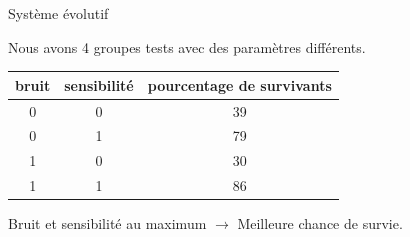 \documentclass[aspectratio=43, a4paper, 12pt]{beamer}
\begin{document}
\begin{frame}{Système évolutif}	

\begin{center}Nous avons 4 groupes tests avec des paramètres différents.\end{center}

\begin{center}\begin{tabular}{|c|c|c|} \hline	
          \centering	
			bruit & sensibilité & pourcentage de survivants \\ \hline
			0 & 0 & 39 \\ \hline
			0 & 1 & 79 \\ \hline
			1 & 0 & 30 \\ \hline
			1 & 1 & 86 \\ \hline
		\end{tabular}\end{center}
		
\begin{center}Bruit et sensibilité au maximum $\rightarrow$ Meilleure chance de survie.\end{center}
\end{frame}
\end{document}
